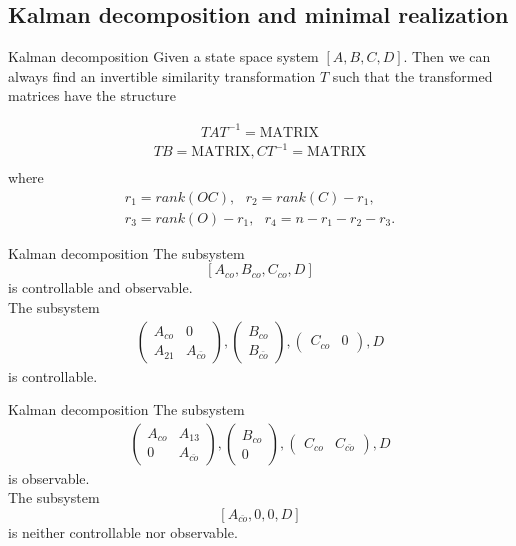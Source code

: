 \subsection{Kalman decomposition and minimal realization}
\begin{frame}{Kalman decomposition}
Given a state space system $[A,B,C,D]$. Then we can
always find an invertible similarity transformation $T$ such
that the transformed matrices have the structure

\begin{align*}
TAT^{−1} =\text{MATRIX}
\end{align*}
\begin{align*}
TB=\text{MATRIX},CT^{-1}=\text{MATRIX}\\
\end{align*}
where
\begin{align*}
r_1=rank(OC),\text{ }r_2=rank(C)-r_1,\\
r_3=rank(O)-r_1,\text{ }r_4=n-r_1-r_2-r_3.
\end{align*}
\end{frame}

\begin{frame}{Kalman decomposition}
\vspace{0.2cm}
The subsystem
$$[ A_{co},B_{co},C_{co},D ]$$
is controllable and observable. \\The subsystem
\begin{align*}
    \begin{pmatrix}
    A_{co}&0\\
    A_{21}&A_{\bar{co}}
    \end{pmatrix}
,   \begin{pmatrix}
    B_{co}\\
    B_{\bar{co}}
    \end{pmatrix}
,\begin{pmatrix}
    C_{co}&0
    \end{pmatrix}
,D
\end{align*}
is controllable. 
\end{frame}


\begin{frame}{Kalman decomposition}
The subsystem
\begin{align*}
    \begin{pmatrix}
    A_{co}&A_{13}\\
    0&A_{\bar{co}}
    \end{pmatrix}
,   \begin{pmatrix}
    B_{co}\\
    0
    \end{pmatrix}
,\begin{pmatrix}
    C_{co}&C_{\bar{co}}
    \end{pmatrix}
,D
\end{align*}
is observable. \\
\vspace{0.2cm}
The subsystem $$[A_{\bar{co}} , 0, 0,D ]$$
is neither controllable nor observable.
\end{frame}

